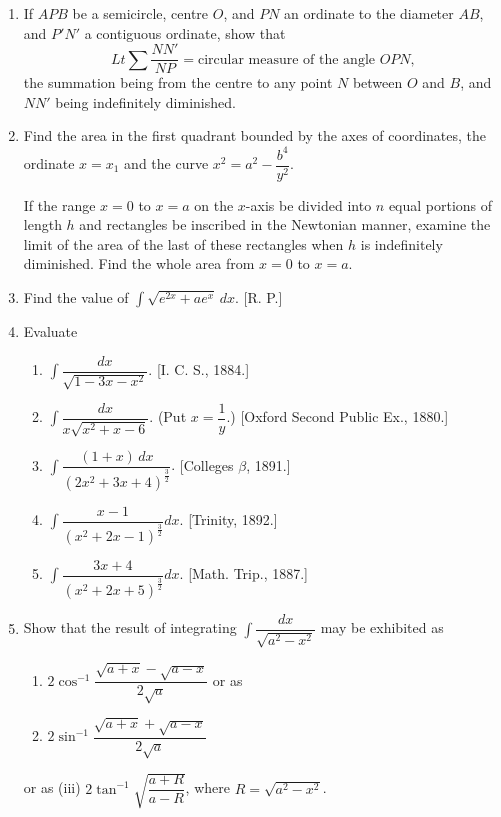 \documentclass[11pt, a4paper]{article}
\newcommand{\source}[1]{\hfill\textnormal{[#1]}}
\begin{document}
\begin{enumerate}[leftmargin=2em]

\item If $APB$ be a semicircle, centre $O$, and $PN$ an ordinate to the diameter $AB$, and $P'N'$ a contiguous ordinate, show that
\[
Lt\sum \dfrac{NN'}{NP} = \text{circular measure of the angle } OPN,
\]
the summation being from the centre to any point $N$ between $O$ and $B$, and $NN'$ being indefinitely diminished.

\item Find the area in the first quadrant bounded by the axes of coordinates, the ordinate $x=x_1$ and the curve $x^2=a^2-\dfrac{b^4}{y^2}$.

If the range $x=0$ to $x=a$ on the $x$-axis be divided into $n$ equal portions of length $h$ and rectangles be inscribed in the Newtonian manner, examine the limit of the area of the last of these rectangles when $h$ is indefinitely diminished. Find the whole area from $x=0$ to $x=a$.

\item Find the value of $\displaystyle\int \sqrt{e^{2x}+ae^x}\,dx$. \source{R. P.}

\item Evaluate
\begin{enumerate}[label=(\roman*)]
\item $\displaystyle\int \dfrac{dx}{\sqrt{1-3x-x^2}}$. \source{I. C. S., 1884.}
\item $\displaystyle\int \dfrac{dx}{x\sqrt{x^2+x-6}}$. (Put $x=\dfrac{1}{y}$.) \source{Oxford Second Public Ex., 1880.}
\item $\displaystyle\int \dfrac{(1+x)\,dx}{(2x^2+3x+4)^{\frac32}}$. \source{Colleges $\beta$, 1891.}
\item $\displaystyle\int \dfrac{x-1}{(x^2+2x-1)^{\frac32}}dx$. \source{Trinity, 1892.}
\item $\displaystyle\int \dfrac{3x+4}{(x^2+2x+5)^{\frac32}}dx$. \source{Math. Trip., 1887.}
\end{enumerate}

\item Show that the result of integrating $\displaystyle\int \dfrac{dx}{\sqrt{a^2-x^2}}$ may be exhibited as
\begin{enumerate}[label=(\roman*)]
\item $2\cos^{-1}\dfrac{\sqrt{a+x}-\sqrt{a-x}}{2\sqrt a}$ or as
\item $2\sin^{-1}\dfrac{\sqrt{a+x}+\sqrt{a-x}}{2\sqrt a}$
\end{enumerate}
or as (iii) $2\tan^{-1}\sqrt{\dfrac{a+R}{a-R}}$, where $R=\sqrt{a^2-x^2}$.


\end{enumerate}
\end{document}
